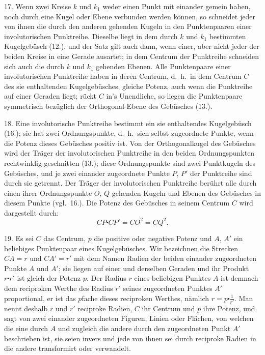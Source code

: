 17. Wenn zwei Kreise $k$ und $k_1$ weder einen Punkt
mit einander gemein haben, noch durch eine Kugel oder
Ebene verbunden werden k\"onnen, so schneidet jeder von
ihnen die durch den anderen gehenden Kugeln in den Punktenpaaren
einer involutorischen Punktreihe. Dieselbe liegt
in dem durch $k$ und $k_1$ bestimmten Kugelgeb\"usch (12.), und
der Satz gilt auch dann, wenn einer, aber nicht jeder der
beiden Kreise in eine Gerade ausartet; in dem Centrum der
Punktreihe schneiden sich auch die durch $k$ und $k_1$ gehenden
Ebenen. Alle Punktenpaare einer involutorischen Punktreihe
haben in deren Centrum, d.~h.\ in dem Centrum $C$ des sie
enthaltenden Kugelgeb\"usches, gleiche Potenz, auch wenn die
Punktreihe auf einer Geraden liegt; r\"uckt $C$ in's Unendliche,
so liegen die Punktenpaare symmetrisch bez\"uglich der Orthogonal-Ebene
des Geb\"usches (13.).

18. Eine involutorische Punktreihe bestimmt ein sie
enthaltendes Kugelgeb\"usch (16.); sie hat zwei {\glqq}Ordnungspunkte{\grqq},
d.~h.\ sich selbst zugeordnete Punkte, wenn die Potenz
dieses Geb\"usches positiv ist. Von der Orthogonalkugel
des Geb\"usches wird der Tr\"ager der involutorischen Punktreihe
in den beiden Ordnungspunkten rechtwinklig geschnitten
(13.); diese Ordnungspunkte sind zwei Punktkugeln des
Geb\"usches, und je zwei einander zugeordnete Punkte $P$, $P'$
der Punktreihe sind durch sie getrennt. Der Tr\"ager der involutorischen
Punktreihe ber\"uhrt alle durch einen ihrer Ordnungspunkte
$O$, $Q$ gehenden Kugeln und Ebenen des Geb\"usches
in diesem Punkte (vgl.\ 16.). Die Potenz des Geb\"usches
in seinem Centrum $C$ wird dargestellt durch:
\[
CP \centerdot CP' = CO^2 = CQ^2.
\]


\begin{center}
\makebox[15em]{\hrulefill}
\end{center}

\label{p3}


\hspace{\parindent}%
19. Es sei $C$ das Centrum, $p$ die positive oder negative
Potenz und $A$, $A'$ ein beliebiges Punktenpaar eines Kugelgeb\"usches.
Wir bezeichnen die Strecken $CA = r$ und $CA' = r'$
mit dem Namen {\glqq}Radien der beiden einander zugeordneten
Punkte $A$ und $A'${\grqq}; sie liegen auf einer und derselben
Geraden und ihr Produkt $r \centerdot r'$ ist gleich der Potenz $p$. Der
Radius $r$ eines beliebigen Punktes $A$ ist demnach dem reciproken
Werthe des Radius $r'$ seines zugeordneten Punktes
$A'$ proportional, er ist das $p$fache dieses reciproken Werthes,
n\"amlich $r = p \centerdot \frac{1}{r'}$. Man nennt deshalb $r$ und $r'$ {\glqq}reciproke
Radien{\grqq}, $C$ ihr Centrum und $p$ ihre Potenz, und sagt von
zwei einander zugeordneten Figuren, Linien oder Fl\"achen,
von welchen die eine durch $A$ und zugleich die andere durch
den zugeordneten Punkt $A'$ beschrieben ist, sie seien {\glqq}invers{\grqq}
und {\glqq}jede von ihnen sei durch reciproke Radien in die andere
transformirt oder verwandelt{\grqq}.

